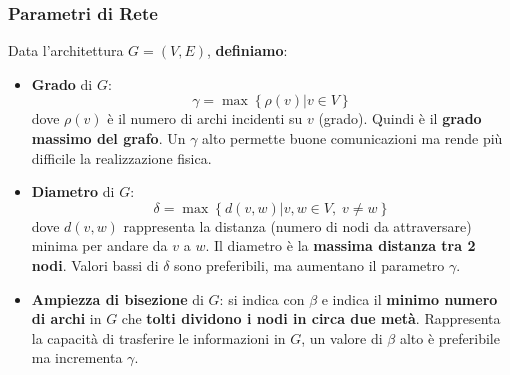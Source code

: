 	\newpage
	
	\subsubsection{Parametri di Rete}
	
	Data l'architettura $G = (V,E)$, \textbf{definiamo}: 
	\begin{itemize}
		\item \textbf{Grado} di $G$:
		$$ \gamma = \max \left\{ \rho (v) | v \in V \right\}$$
		dove $\rho (v)$ è il numero di archi incidenti su $v$ (grado). Quindi è il \textbf{grado massimo del grafo}. Un $\gamma$ alto permette buone comunicazioni ma rende più difficile la realizzazione fisica.\\
		
		\item \textbf{Diametro} di $G$: 
		$$ \delta = \max \left\{ d(v,w) | v,w \in V, \; v \neq w \right\}$$
		dove $d(v,w)$ rappresenta la distanza (numero di nodi da attraversare) minima per andare da $v$ a $w$. Il diametro è la \textbf{massima distanza tra 2 nodi}. Valori bassi di $\delta$ sono preferibili, ma aumentano il parametro $\gamma$.\\
		
		\item \textbf{Ampiezza di bisezione} di $G$: si indica con $\beta$ e indica il \textbf{minimo numero di archi} in $G$ che \textbf{tolti dividono i nodi in circa due metà}. Rappresenta la capacità di trasferire le informazioni in $G$, un valore di $\beta$ alto è preferibile ma incrementa $\gamma$.\\
	\end{itemize}
	
	
	